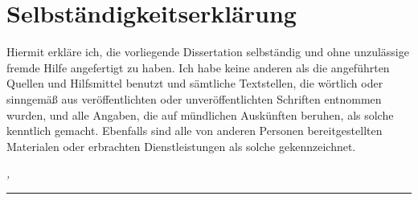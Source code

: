 %
\chapter*{Selbständigkeitserklärung}
\label{sec:declaration}
\thispagestyle{empty}

Hiermit erkläre ich, die vorliegende Dissertation selbständig und ohne
unzulässige fremde Hilfe angefertigt zu haben. Ich habe keine anderen als die
angeführten Quellen und Hilfsmittel benutzt und sämtliche Textstellen, die
wörtlich oder sinngemäß aus veröffentlichten oder unveröffentlichten
Schriften entnommen wurden, und alle Angaben, die auf mündlichen
Auskünften beruhen, als solche kenntlich gemacht. Ebenfalls sind alle von
anderen Personen bereitgestellten Materialen oder erbrachten Dienstleistungen
als solche gekennzeichnet.
\bigskip

\noindent\textit{\thesisUniversityCity, \thesisDate}

\smallskip

\begin{flushright}
	\begin{minipage}{5cm}
		\rule{\textwidth}{1pt}
		\centering\thesisName
	\end{minipage}
\end{flushright}

